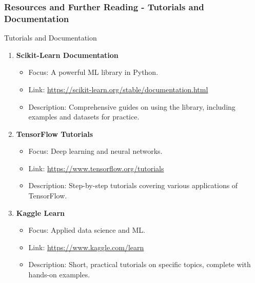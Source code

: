 \documentclass[aspectratio=169]{beamer}
\begin{document}
\begin{frame}[fragile]
    \frametitle{Resources and Further Reading - Tutorials and Documentation}
    \begin{block}{Tutorials and Documentation}
        \begin{enumerate}
            \item \textbf{Scikit-Learn Documentation}
                \begin{itemize}
                    \item Focus: A powerful ML library in Python.
                    \item Link: \url{https://scikit-learn.org/stable/documentation.html}
                    \item Description: Comprehensive guides on using the library, including examples and datasets for practice.
                \end{itemize}
            \item \textbf{TensorFlow Tutorials}
                \begin{itemize}
                    \item Focus: Deep learning and neural networks.
                    \item Link: \url{https://www.tensorflow.org/tutorials}
                    \item Description: Step-by-step tutorials covering various applications of TensorFlow.
                \end{itemize}
            \item \textbf{Kaggle Learn}
                \begin{itemize}
                    \item Focus: Applied data science and ML.
                    \item Link: \url{https://www.kaggle.com/learn}
                    \item Description: Short, practical tutorials on specific topics, complete with hands-on examples.
                \end{itemize}
        \end{enumerate}
    \end{block}
\end{frame}
\end{document}
